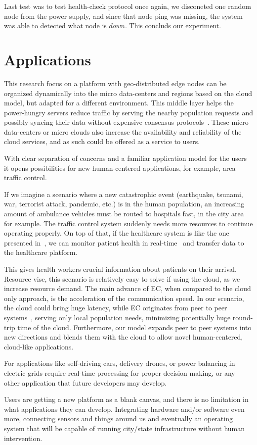 Last test was to test health-check protocol once again, we disconeted one random node from the power supply, and since that node ping was missing, the system was able to detected what node is $down$. This concluds our experiment.
%
%
\section{Applications}\label{sec:app}
%
This research focus on a platform with geo-distributed edge nodes can be organized dynamically into the micro data-centers and regions based on the cloud model, but adapted for a different environment. This middle layer helps the power-hungry servers reduce traffic by serving the nearby population requests and possibly syncing their data without expensive consensus protocols~\cite{inproceedingsSimic2}. These micro data-centers or micro clouds also increase the availability and reliability of the cloud services, and as such could be offered as a service to users.

With clear separation of concerns and a familiar application model for the users it opens possibilities for new human-centered applications, for example, area traffic control. 

If we imagine a scenario where a new catastrophic event (earthquake, tsunami, war, terrorist attack, pandemic, etc.) is in the human population, an increasing amount of ambulance vehicles must be routed to hospitals fast, in the city area for example. The traffic control system suddenly needs more resources to continue operating properly. On top of that, if the healthcare system is like the one presented in~\cite{OmarBBKR19, inproceedingsSimic5}, we can monitor patient health in real-time~\cite{Al-KhafajiyBCAK19} and transfer data to the healthcare platform. 

This gives health workers crucial information about patients on their arrival. Resource vise, this scenario is relatively easy to solve if using the cloud, as we increase resource demand. The main advance of EC, when compared to the cloud only approach, is the acceleration of the communication speed. In our scenario, the cloud could bring huge latency, while EC originates from peer to peer systems~\cite{LopezMEDHIBFR15}, serving only local population needs, minimizing potentially huge round-trip time of the cloud. Furthermore, our model expands peer to peer systems into new directions and blends them with the cloud to allow novel human-centered, cloud-like applications. 

For applications like self-driving cars, delivery drones, or power balancing in electric grids require real-time processing for proper decision making, or any other application that future developers may develop.

Users are getting a new platform as a blank canvas, and there is no limitation in what applications they can develop. Integrating hardware and/or software even more, connecting sensors and things around us and eventually an operating system that will be capable of running city/state infrastructure without human intervention.
%
%